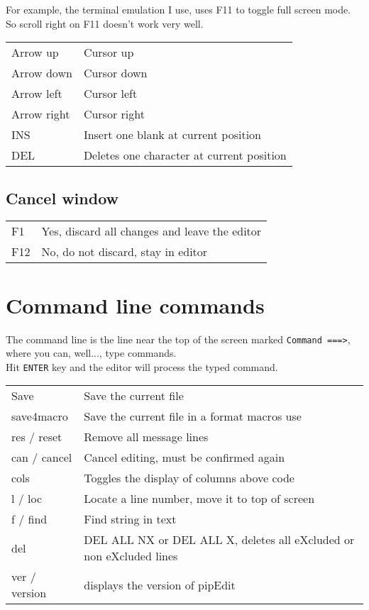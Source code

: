 \documentclass{report}
\begin{document}
For example, the terminal emulation I
use, uses F11 to toggle full screen mode. So scroll right on F11 doesn't work 
very well.  \\

\begin{tabular}{l l}
Arrow up & Cursor up \\
Arrow down & Cursor down \\
Arrow left & Cursor left \\
Arrow right & Cursor right \\
INS & Insert one blank at current position \\
DEL & Deletes one character at current position \\
\end{tabular}

\section{Cancel window}

\begin{tabular}{l l}
F1 & Yes, discard all changes and leave the editor \\
F12 & No, do not discard, stay in editor \\
\end{tabular}

\chapter{Command line commands}

The command line is the line near the top of the screen marked \texttt{Command ===>}, where you can, well..., type commands. \\
Hit \texttt{ENTER} key and the editor will process the typed command. \\

\begin{tabular}{l l}
Save & Save the current file \\
save4macro & Save the current file in a format macros use \\
res / reset & Remove all message lines \\
can / cancel & Cancel editing, must be confirmed again \\
cols & Toggles the display of columns above code \\
l / loc & Locate a line number, move it to top of screen \\
f / find & Find string in text \\
del & DEL ALL NX or DEL ALL X, deletes all eXcluded or non eXcluded lines \\
ver / version & displays the version of pipEdit\\
\end{tabular}
\end{document}
